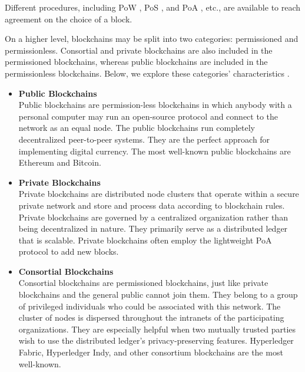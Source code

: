  
Different procedures, including \ac{PoW} \cite{pow}, \ac{PoS} \cite{pos}, and \ac{PoA} \cite{poa}, etc., are available to reach agreement on the choice of a block.
 
\vspace{.5cm}
 
On a higher level, blockchains may be split into two categories: permissioned and permissionless. Consortial and private blockchains are also included in the permissioned blockchains, whereas public blockchains are included in the permissionless blockchains. Below, we explore these categories' characteristics \cite{typebc1, typebc2}.

\begin{itemize}
   

 \item \textbf{Public Blockchains} \\
Public blockchains are permission-less blockchains in which anybody with a personal computer may run an open-source protocol and connect to the network as an equal node. The public blockchains run completely decentralized peer-to-peer systems. They are the perfect approach for implementing digital currency. The most well-known public blockchains are Ethereum and Bitcoin.

\vspace{.5cm}

\item \textbf{Private Blockchains} \\
Private blockchains are distributed node clusters that operate within a secure private network and store and process data according to blockchain rules. Private blockchains are governed by a centralized organization rather than being decentralized in nature. They primarily serve as a distributed ledger that is scalable. Private blockchains often employ the lightweight \ac{PoA} protocol to add new blocks.

\vspace{.5cm}

 \item \textbf{Consortial Blockchains}\\
Consortial blockchains are permissioned blockchains, just like private blockchains and the general public cannot join them. They belong to a group of privileged individuals who could be associated with this network. The cluster of nodes is dispersed throughout the intranets of the participating organizations. They are especially helpful when two mutually trusted parties wish to use the distributed ledger's privacy-preserving features. Hyperledger Fabric, Hyperledger Indy, and other consortium blockchains are the most well-known.
\end{itemize}

